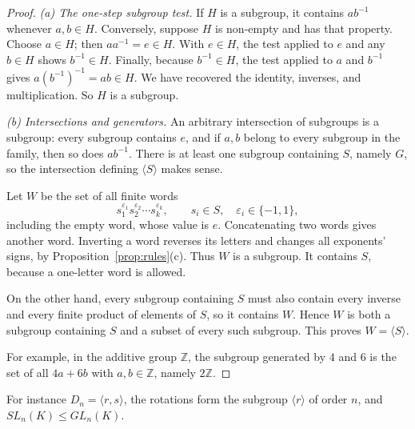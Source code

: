 \begin{proof}
\emph{(a) The one-step subgroup test.}
If $H$ is a subgroup, it contains $ab^{-1}$ whenever $a,b\in H$.
Conversely, suppose $H$ is non-empty and has that property.
Choose $a\in H$; then $aa^{-1}=e\in H$. With $e\in H$, the
test applied to $e$ and any $b\in H$ shows $b^{-1}\in H$.
Finally, because $b^{-1}\in H$, the test applied to $a$
and $b^{-1}$ gives $a(b^{-1})^{-1}=ab\in H$.
We have recovered the identity, inverses, and multiplication.
So $H$ is a subgroup.

\emph{(b) Intersections and generators.}
An arbitrary intersection of subgroups is a subgroup: every
subgroup contains $e$, and if $a,b$ belong to every subgroup
in the family, then so does $ab^{-1}$. There is at least one
subgroup containing $S$, namely $G$, so the intersection
defining $\langle S\rangle$ makes sense.

Let $W$ be the set of all finite words
\[
s_1^{\varepsilon_1}s_2^{\varepsilon_2}\cdots
s_k^{\varepsilon_k},
\qquad s_i\in S,\quad\varepsilon_i\in\{-1,1\},
\]
including the empty word, whose value is $e$.
Concatenating two words gives another word.
Inverting a word reverses its letters and changes all
exponents' signs, by Proposition~\ref{prop:rules}(c).
Thus $W$ is a subgroup. It contains $S$, because a one-letter
word is allowed.

On the other hand, every subgroup containing $S$ must also
contain every inverse and every finite product of elements of
$S$, so it contains $W$. Hence $W$ is both a subgroup
containing $S$ and a subset of every such subgroup.
This proves $W=\langle S\rangle$.

For example, in the additive group $\mathbb Z$, the subgroup
generated by $4$ and $6$ is the set of all $4a+6b$ with
$a,b\in\mathbb Z$, namely $2\mathbb Z$.
\end{proof}

For instance $D_n=\langle r,s\rangle$, the rotations form the subgroup $\langle r\rangle$ of order $n$, and $SL_n(K)\le GL_n(K)$.

